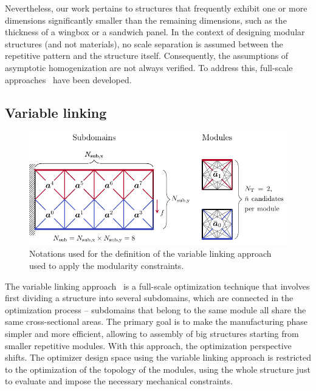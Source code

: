 Nevertheless, our work pertains to structures that frequently exhibit one or more dimensions significantly smaller than the remaining dimensions, such as the thickness of a wingbox or a sandwich panel. In the context of designing modular structures (and not materials), no scale separation is assumed between the repetitive pattern and the structure itself. Consequently, the assumptions of asymptotic homogenization are not always verified. To address this, full-scale approaches~ have been developed.

\subsection{Variable linking}
\begin{figure}
    \centering
    \includegraphics{figures/05_cellular_opt/00_modules_VL_bc/modules_bc.pdf}
    \caption{Notations used for the definition of the variable linking approach used to apply the modularity constraints.}
    \label{fig:05_VL}
\end{figure}

The variable linking approach~ is a full-scale optimization technique that involves first dividing a structure into several subdomains, which are connected in the optimization process -- \ie subdomains that belong to the same module all share the same cross-sectional areas. The primary goal is to make the manufacturing phase simpler and more efficient, allowing to assembly of big structures starting from smaller repetitive modules. With this approach, the optimization perspective shifts. The optimizer design space using the variable linking approach is restricted to the optimization of the topology of the modules, using the whole structure just to evaluate and impose the necessary mechanical constraints.

